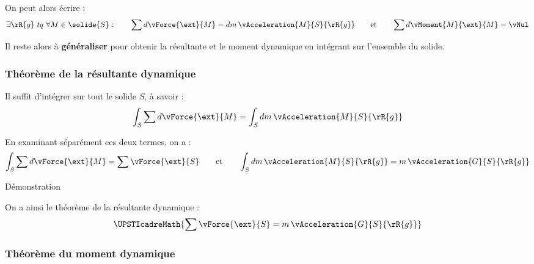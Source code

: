 \documentclass[12pt]{article}
\begin{document}
\noindent On peut alors écrire :
\[ \exists \rR{g}~ tq~ \forall M\in \solide{S}: \qquad \sum d\vForce{\ext}{M}=dm\,\vAcceleration{M}{S}{\rR{g}} \qquad \text{et} \qquad \sum d\vMoment{M}{\ext}{M}=\vNul \]

Il reste alors à \textbf{généraliser} pour obtenir la résultante et le moment dynamique en intégrant sur l'ensemble du solide.

\subsubsection{Théorème de la résultante dynamique}

Il suffit d'intégrer sur tout le solide $S$, à savoir :
\[ \int_S\sum d\vForce{\ext}{M}=\int_S dm\,\vAcceleration{M}{S}{\rR{g}} \]

En examinant séparément ces deux termes, on a : 
\[ \int_S\sum d\vForce{\ext}{M}=\sum\vForce{\ext}{S} \qquad \textrm{et} \qquad \int_S dm\,\vAcceleration{M}{S}{\rR{g}}=m\,\vAcceleration{G}{S}{\rR{g}} \]

\begin{bclogo}[logo=\bcbook,couleur=DarkOrange!5,arrondi=0.1,sousTitre=]{Démonstration}
{\vspace{20em}}
\end{bclogo}
 
On a ainsi le théorème de la résultante dynamique :
\[ \UPSTIcadreMath{\sum\vForce{\ext}{S}=m\,\vAcceleration{G}{S}{\rR{g}}} \]

\subsubsection{Théorème du moment dynamique}
\end{document}
